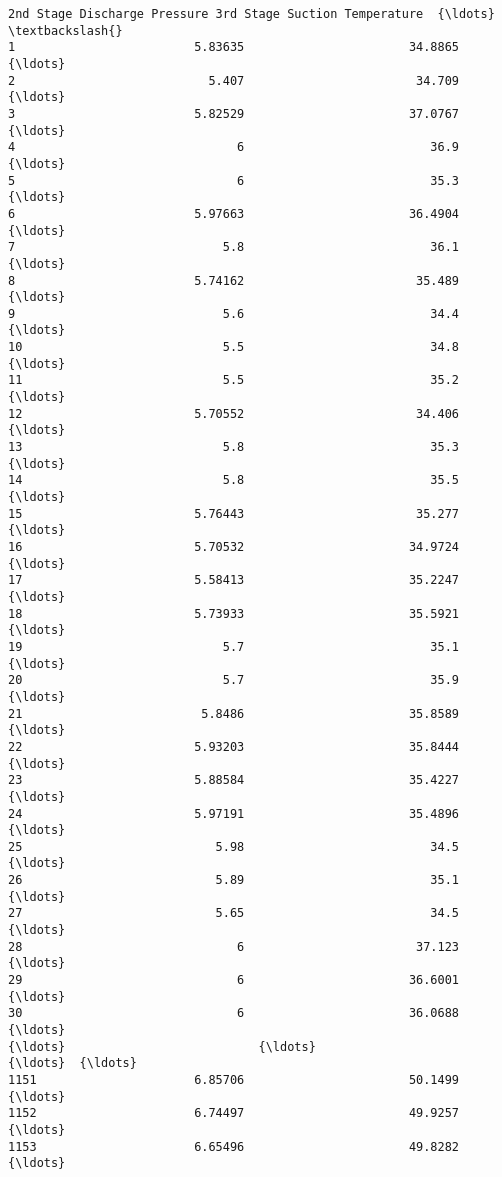 \documentclass[11pt]{article}
\begin{document}
\begin{tcolorbox}[breakable, size=fbox, boxrule=.5pt, pad at break*=1mm, opacityfill=0]
\begin{Verbatim}[commandchars=\\\{\}]
     2nd Stage Discharge Pressure 3rd Stage Suction Temperature  {\ldots}  \textbackslash{}
1                         5.83635                       34.8865  {\ldots}
2                           5.407                        34.709  {\ldots}
3                         5.82529                       37.0767  {\ldots}
4                               6                          36.9  {\ldots}
5                               6                          35.3  {\ldots}
6                         5.97663                       36.4904  {\ldots}
7                             5.8                          36.1  {\ldots}
8                         5.74162                        35.489  {\ldots}
9                             5.6                          34.4  {\ldots}
10                            5.5                          34.8  {\ldots}
11                            5.5                          35.2  {\ldots}
12                        5.70552                        34.406  {\ldots}
13                            5.8                          35.3  {\ldots}
14                            5.8                          35.5  {\ldots}
15                        5.76443                        35.277  {\ldots}
16                        5.70532                       34.9724  {\ldots}
17                        5.58413                       35.2247  {\ldots}
18                        5.73933                       35.5921  {\ldots}
19                            5.7                          35.1  {\ldots}
20                            5.7                          35.9  {\ldots}
21                         5.8486                       35.8589  {\ldots}
22                        5.93203                       35.8444  {\ldots}
23                        5.88584                       35.4227  {\ldots}
24                        5.97191                       35.4896  {\ldots}
25                           5.98                          34.5  {\ldots}
26                           5.89                          35.1  {\ldots}
27                           5.65                          34.5  {\ldots}
28                              6                        37.123  {\ldots}
29                              6                       36.6001  {\ldots}
30                              6                       36.0688  {\ldots}
{\ldots}                           {\ldots}                           {\ldots}  {\ldots}
1151                      6.85706                       50.1499  {\ldots}
1152                      6.74497                       49.9257  {\ldots}
1153                      6.65496                       49.8282  {\ldots}

\end{Verbatim}
\end{tcolorbox}
\end{document}
